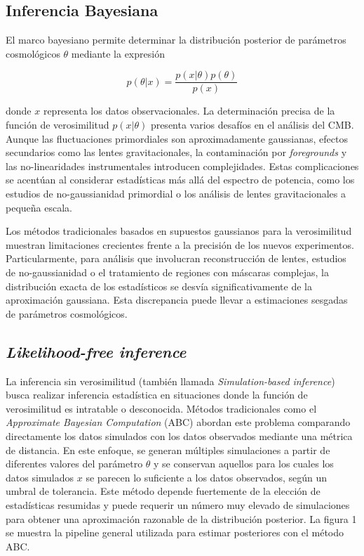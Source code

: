 \documentclass[11pt]{article}
\begin{document}
\subsection{Inferencia Bayesiana}
El marco bayesiano permite determinar la distribución posterior de parámetros cosmológicos $\theta$ mediante la expresión 

\begin{equation}
p(\theta|x) = \frac{p(x|\theta)p(\theta)}{p(x)}
\end{equation}

donde $x$ representa los datos observacionales. La determinación precisa de la función de verosimilitud $p(x|\theta)$ presenta varios desafíos en el análisis del CMB. Aunque las fluctuaciones primordiales son aproximadamente gaussianas, efectos secundarios como las lentes gravitacionales, la contaminación por \textit{foregrounds} y las no-linearidades instrumentales introducen complejidades. Estas complicaciones se acentúan al considerar estadísticas más allá del espectro de potencia, como los estudios de no-gaussianidad primordial o los análisis de lentes gravitacionales a pequeña escala.

Los métodos tradicionales basados en supuestos gaussianos para la verosimilitud muestran limitaciones crecientes frente a la precisión de los nuevos experimentos. Particularmente, para análisis que involucran reconstrucción de lentes, estudios de no-gaussianidad o el tratamiento de regiones con máscaras complejas, la distribución exacta de los estadísticos se desvía significativamente de la aproximación gaussiana. Esta discrepancia puede llevar a estimaciones sesgadas de parámetros cosmológicos.

\subsection{\textit{Likelihood-free inference}}
La inferencia sin verosimilitud (también llamada \textit{Simulation-based inference}) busca realizar inferencia estadística en situaciones donde la función de verosimilitud es intratable o desconocida. Métodos tradicionales como el \textit{Approximate Bayesian Computation} (ABC) abordan este problema comparando directamente los datos simulados con los datos observados mediante una métrica de distancia. En este enfoque, se generan múltiples simulaciones a partir de diferentes valores del parámetro $\theta$ y se conservan aquellos para los cuales los datos simulados $x$ se parecen lo suficiente a los datos observados, según un umbral de tolerancia. Este método depende fuertemente de la elección de estadísticas resumidas y puede requerir un número muy elevado de simulaciones para obtener una aproximación razonable de la distribución posterior. La figura 1 se muestra la pipeline general utilizada para estimar posteriores con el método ABC.
\end{document}
